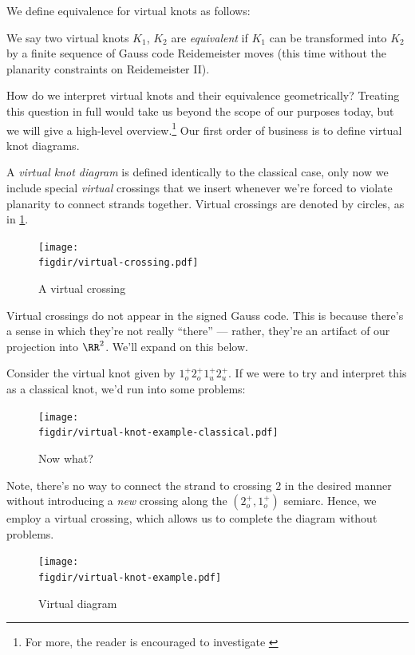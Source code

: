 We define equivalence for virtual knots as follows:
\begin{definition}
  We say two virtual knots $K_1$, $K_2$ are \emph{equivalent} if $K_1$
  can be transformed into $K_2$ by a finite sequence of Gauss code
  Reidemeister moves (this time without the planarity constraints on
  Reidemeister II).
\end{definition}
How do we interpret virtual knots and their equivalence geometrically?
Treating this question in full would take us beyond the scope of our
purposes today, but we will give a high-level overview.\footnote{For
  more, the reader is encouraged to investigate \cite{Carter2002May}}
Our first order of business is to define virtual knot diagrams.
\begin{definition}
  A \emph{virtual knot diagram} is defined identically to the
  classical case, only now we include special \emph{virtual}
  crossings that we insert whenever we're forced to violate planarity
  to connect strands together. Virtual crossings are denoted by
  circles, as in \cref{fig:virtual-crossing}.
\end{definition}
\begin{figure}[H]
  \centering
  \texttt{[image: \\figdir/virtual-crossing.pdf]}
  \caption{A virtual crossing}
  \label{fig:virtual-crossing}
\end{figure}
\begin{note}
  Virtual crossings do not appear in the signed Gauss code. This is
  because there's a sense in which they're not really ``there'' ---
  rather, they're an artifact of our projection into $\RR^2$. We'll
  expand on this below.
\end{note}
\begin{example}
  Consider the virtual knot given by $1^+_o 2^+_o 1^+_u 2^+_u$. If we
  were to try and interpret this as a classical knot, we'd run into
  some problems:
  \begin{figure}[H]
    \centering
    \texttt{[image: \\figdir/virtual-knot-example-classical.pdf]}
    \caption{Now what?}
  \end{figure}
  Note, there's no way to connect the strand to crossing $2$ in the
  desired manner without introducing a \emph{new} crossing along the
  $(2^+_o, 1^+_o)$ semiarc. Hence, we employ a virtual crossing, which
  allows us to complete the diagram without problems.
  \begin{figure}[H]
    \centering
    \texttt{[image: \\figdir/virtual-knot-example.pdf]}
    \caption{Virtual diagram}
    \label{fig:virtual-trefoil-grid-diagram}
    \qedhere
  \end{figure}
\end{example}
